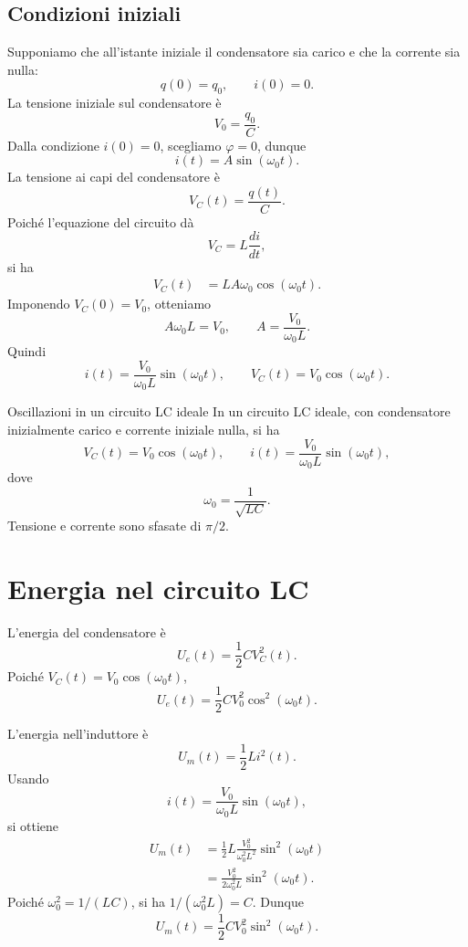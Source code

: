 \documentclass[a4paper]{article}
\begin{document}
\subsection{Condizioni iniziali}

Supponiamo che all'istante iniziale il condensatore sia carico e che la corrente sia nulla:
\[
q(0)=q_0,
\qquad
i(0)=0.
\]
La tensione iniziale sul condensatore è
\[
V_0=\frac{q_0}{C}.
\]
Dalla condizione \(i(0)=0\), scegliamo \(\varphi=0\), dunque
\[
i(t)=A\sin(\omega_0t).
\]
La tensione ai capi del condensatore è
\[
V_C(t)=\frac{q(t)}{C}.
\]
Poiché l'equazione del circuito dà
\[
V_C=L\frac{di}{dt},
\]
si ha
\begin{align*}
V_C(t)
&=L A\omega_0\cos(\omega_0t).
\end{align*}
Imponendo \(V_C(0)=V_0\), otteniamo
\[
A\omega_0L=V_0,
\qquad
A=\frac{V_0}{\omega_0L}.
\]
Quindi
\[
i(t)=\frac{V_0}{\omega_0L}\sin(\omega_0t),
\qquad
V_C(t)=V_0\cos(\omega_0t).
\]

\begin{snippetproposition}{Oscillazioni in un circuito LC ideale}
In un circuito LC ideale, con condensatore inizialmente carico e corrente iniziale nulla, si ha
\[
    V_C(t)=V_0\cos(\omega_0t),
    \qquad
    i(t)=\frac{V_0}{\omega_0L}\sin(\omega_0t),
\]
dove
\[
    \omega_0=\frac{1}{\sqrt{LC}}.
\]
Tensione e corrente sono sfasate di \(\pi/2\).
\end{snippetproposition}

\begin{center}
\end{center}

\section{Energia nel circuito LC}

L'energia del condensatore è
\[
U_e(t)=\frac{1}{2}CV_C^2(t).
\]
Poiché \(V_C(t)=V_0\cos(\omega_0t)\),
\[
U_e(t)=\frac{1}{2}CV_0^2\cos^2(\omega_0t).
\]

L'energia nell'induttore è
\[
U_m(t)=\frac{1}{2}Li^2(t).
\]
Usando
\[
i(t)=\frac{V_0}{\omega_0L}\sin(\omega_0t),
\]
si ottiene
\begin{align*}
U_m(t)
&=\frac{1}{2}L\frac{V_0^2}{\omega_0^2L^2}\sin^2(\omega_0t) \\
&=\frac{V_0^2}{2\omega_0^2L}\sin^2(\omega_0t).
\end{align*}
Poiché \(\omega_0^2=1/(LC)\), si ha \(1/(\omega_0^2L)=C\). Dunque
\[
U_m(t)=\frac{1}{2}CV_0^2\sin^2(\omega_0t).
\]
\end{document}
